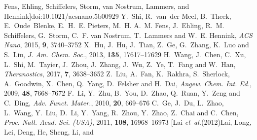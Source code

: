 \documentclass[twoside,twocolumn,9pt]{article}
\begin{document}
\begin{mcitethebibliography}{79}
  Fens, Ehling, Schiffelers, Storm, van Nostrum, Lammers, and
  Hennink]{doi:10.1021/acsnano.5b00929}
Y.~Shi, R.~van~der Meel, B.~Theek, E.~Oude~Blenke, E.~H.~E. Pieters, M.~H.
  A.~M. Fens, J.~Ehling, R.~M. Schiffelers, G.~Storm, C.~F. van Nostrum,
  T.~Lammers and W.~E. Hennink, \emph{ACS Nano}, 2015, \textbf{9},
  3740--3752\relax
\mciteBstWouldAddEndPuncttrue
\mciteSetBstMidEndSepPunct{\mcitedefaultmidpunct}
{\mcitedefaultendpunct}{\mcitedefaultseppunct}\relax
\EndOfBibitem
{}
X.~Hu, J.~Hu, J.~Tian, Z.~Ge, G.~Zhang, K.~Luo and S.~Liu, \emph{J. Am. Chem.
  Soc.}, 2013, \textbf{135}, 17617--17629\relax
\mciteBstWouldAddEndPuncttrue
\mciteSetBstMidEndSepPunct{\mcitedefaultmidpunct}
{\mcitedefaultendpunct}{\mcitedefaultseppunct}\relax
\EndOfBibitem
{}
H.~Wang, J.~Chen, C.~Xu, L.~Shi, M.~Tayier, J.~Zhou, J.~Zhang, J.~Wu, Z.~Ye,
  T.~Fang and W.~Han, \emph{Theranostics}, 2017, \textbf{7}, 3638--3652\relax
\mciteBstWouldAddEndPuncttrue
\mciteSetBstMidEndSepPunct{\mcitedefaultmidpunct}
{\mcitedefaultendpunct}{\mcitedefaultseppunct}\relax
\EndOfBibitem
{}
Z.~Liu, A.~Fan, K.~Rakhra, S.~Sherlock, A.~Goodwin, X.~Chen, Q.~Yang,
  D.~Felsher and H.~Dai, \emph{Angew. Chem. Int. Ed.}, 2009, \textbf{48},
  7668--7672\relax
\mciteBstWouldAddEndPuncttrue
\mciteSetBstMidEndSepPunct{\mcitedefaultmidpunct}
{\mcitedefaultendpunct}{\mcitedefaultseppunct}\relax
\EndOfBibitem
{}
F.~Li, Y.~Zhu, B.~You, D.~Zhao, Q.~Ruan, Y.~Zeng and C.~Ding, \emph{Adv. Funct.
  Mater.}, 2010, \textbf{20}, 669--676\relax
\mciteBstWouldAddEndPuncttrue
\mciteSetBstMidEndSepPunct{\mcitedefaultmidpunct}
{\mcitedefaultendpunct}{\mcitedefaultseppunct}\relax
\EndOfBibitem
{}
C.~Ge, J.~Du, L.~Zhao, L.~Wang, Y.~Liu, D.~Li, Y.~Yang, R.~Zhou, Y.~Zhao,
  Z.~Chai and C.~Chen, \emph{Proc. Natl. Acad. Sci. (USA)}, 2011, \textbf{108},
  16968--16973\relax
\mciteBstWouldAddEndPuncttrue
\mciteSetBstMidEndSepPunct{\mcitedefaultmidpunct}
{\mcitedefaultendpunct}{\mcitedefaultseppunct}\relax
\EndOfBibitem
\bibitem[Lai \emph{et~al.}(2012)Lai, Long, Lei, Deng, He, Sheng, Li, and

\end{mcitethebibliography}
\end{document}
